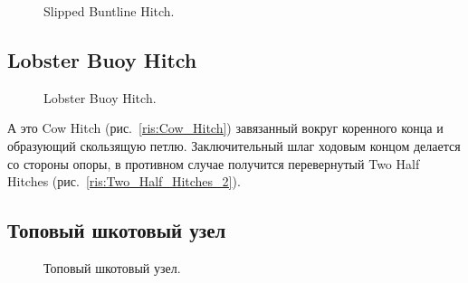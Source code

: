 \begin{figure}[H]\centering
	\begin{minipage}{1\linewidth}
		\begin{center}
			\tcbox[enhanced jigsaw,colframe=black,opacityframe=0.5,opacityback=0.5]
			{\centering{}}
		\end{center}
	\end{minipage}
\caption{Slipped Buntline Hitch.}
\label{ris:Slipped_Buntline_Hitch}
\end{figure}

\subsection{Lobster Buoy Hitch}

\begin{figure}[H]\centering
	\begin{minipage}{1\linewidth}
		\begin{center}
			\tcbox[enhanced jigsaw,colframe=black,opacityframe=0.5,opacityback=0.5]
			{\centering{}}
		\end{center}
	\end{minipage}
\caption{Lobster Buoy Hitch.}
\label{ris:Lobster_Buoy_Hitch}
\end{figure}

А это Cow Hitch (рис.~\ref{ris:Cow_Hitch}) завязанный вокруг коренного конца и образующий скользящую петлю. Заключительный шлаг ходовым концом делается со стороны опоры, в противном случае получится перевернутый Two Half Hitches (рис.~\ref{ris:Two_Half_Hitches_2}).

\subsection{Топовый шкотовый узел}

\begin{figure}[H]\centering
	\begin{minipage}{1\linewidth}
		\begin{center}
			\tcbox[enhanced jigsaw,colframe=black,opacityframe=0.5,opacityback=0.5]
			{\centering{}}
		\end{center}
	\end{minipage}
\caption{Топовый шкотовый узел.}
\label{ris:Top_shkot}
\end{figure}

